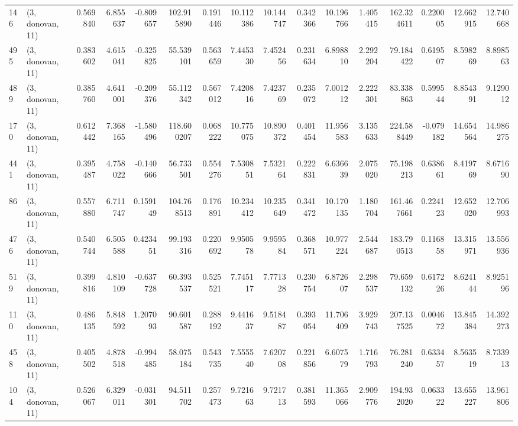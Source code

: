 \begin{tabular}{llrrrrrrrrrrrrrr}
146 &  (3, donovan, 11) &   0.569840 &   6.855637 &  -0.809657 &   102.915890 &   0.191446 &  10.112386 &  10.144747 &  0.342366 &  10.196766 &   1.405415 &   162.324611 &  0.220005 &  12.662915 &  12.740668 \\
495 &  (3, donovan, 11) &   0.383602 &   4.615041 &  -0.325825 &    55.539101 &   0.563659 &   7.445330 &   7.452456 &  0.231634 &   6.898810 &   2.292204 &    79.184422 &  0.619507 &   8.598269 &   8.898563 \\
489 &  (3, donovan, 11) &   0.385760 &   4.641001 &  -0.209376 &    55.112342 &   0.567012 &   7.420816 &   7.423769 &  0.235072 &   7.001212 &   2.222301 &    83.338863 &  0.599544 &   8.854391 &   9.129012 \\
170 &  (3, donovan, 11) &   0.612442 &   7.368165 &  -1.580496 &   118.600207 &   0.068222 &  10.775075 &  10.890372 &  0.401454 &  11.956583 &   3.135633 &   224.588449 & -0.079182 &  14.654564 &  14.986275 \\
441 &  (3, donovan, 11) &   0.395487 &   4.758022 &  -0.140666 &    56.733501 &   0.554276 &   7.530851 &   7.532164 &  0.222831 &   6.636639 &   2.075020 &    75.198213 &  0.638661 &   8.419769 &   8.671690 \\
86  &  (3, donovan, 11) &   0.557880 &   6.711747 &   0.159149 &   104.768513 &   0.176891 &  10.234412 &  10.235649 &  0.341472 &  10.170135 &   1.180704 &   161.467661 &  0.224123 &  12.652020 &  12.706993 \\
476 &  (3, donovan, 11) &   0.540744 &   6.505588 &   0.423451 &    99.193316 &   0.220692 &   9.950578 &   9.959584 &  0.368571 &  10.977224 &   2.544687 &   183.790513 &  0.116858 &  13.315971 &  13.556936 \\
519 &  (3, donovan, 11) &   0.399816 &   4.810109 &  -0.637728 &    60.393537 &   0.525521 &   7.745117 &   7.771328 &  0.230754 &   6.872607 &   2.298537 &    79.659132 &  0.617226 &   8.624144 &   8.925196 \\
110 &  (3, donovan, 11) &   0.486135 &   5.848592 &   1.207093 &    90.601587 &   0.288192 &   9.441637 &   9.518487 &  0.393054 &  11.706409 &   3.929743 &   207.137525 &  0.004672 &  13.845384 &  14.392273 \\
458 &  (3, donovan, 11) &   0.405502 &   4.878518 &  -0.994485 &    58.075184 &   0.543735 &   7.555540 &   7.620708 &  0.221856 &   6.607579 &   1.716793 &    76.281240 &  0.633457 &   8.563519 &   8.733913 \\
104 &  (3, donovan, 11) &   0.526067 &   6.329011 &  -0.031301 &    94.511702 &   0.257473 &   9.721663 &   9.721713 &  0.381593 &  11.365066 &   2.909776 &   194.932020 &  0.063322 &  13.655227 &  13.961806 \\

\end{tabular}
